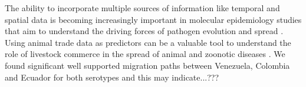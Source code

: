 \documentclass[10pt]{article}
\begin{document}
The ability to incorporate multiple sources of information like temporal and spatial data is becoming increasingly important in molecular epidemiology studies that aim to understand the driving forces of pathogen evolution and spread \cite{towards,combining,MEP,roots}. 
Using animal trade data as predictors can be a valuable tool to understand the role of livestock commerce in the spread of animal and zoonotic diseases \cite{Nelson2011}.
We found significant well supported migration paths between Venezuela, Colombia and Ecuador for both serotypes and this may indicate...???
\end{document}

